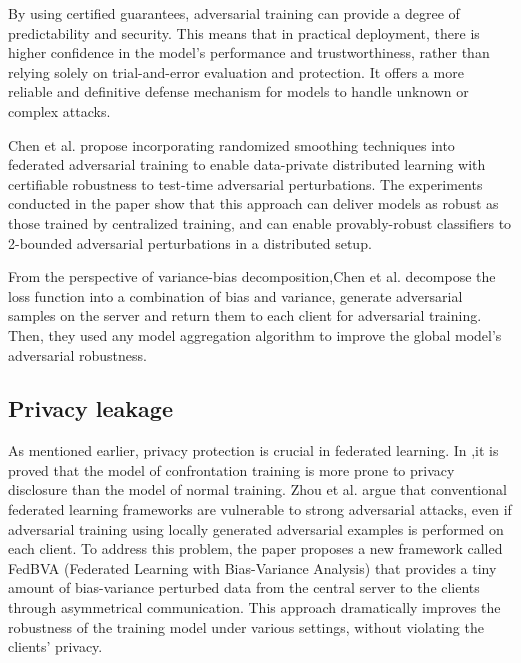 \documentclass[conference]{IEEEtran}
\begin{document}
By using certified guarantees, adversarial training can provide a degree of predictability and security. 
This means that in practical deployment, there is higher confidence in the model's performance and trustworthiness, 
rather than relying solely on trial-and-error evaluation and protection. 
It offers a more reliable and definitive defense mechanism for models to handle unknown or complex attacks.  

Chen et al.\cite{b104} propose incorporating randomized smoothing techniques into federated adversarial
training to enable data-private distributed learning with certifiable robustness to test-time adversarial
perturbations. The experiments conducted in the paper show that this approach can deliver models as
robust as those trained by centralized training, and can enable provably-robust classifiers to
2-bounded adversarial perturbations in a distributed setup.

From the perspective of variance-bias decomposition,Chen et al.\cite{b108} decompose the 
loss function into a combination of bias and variance, generate adversarial samples on the server 
and return them to each client for adversarial training. Then, they used any model aggregation 
algorithm to improve the global model's adversarial robustness.

\subsection{Privacy leakage} 
As mentioned earlier, privacy protection is crucial in federated learning.
In \cite{b106},it is proved that the model of confrontation training is more prone to
privacy disclosure than the model of normal training.
Zhou et al.\cite{b103} argue that conventional federated learning frameworks are vulnerable
to strong adversarial attacks, even if adversarial training using locally
generated adversarial examples is performed on each client. To address this
problem, the paper proposes a new framework called FedBVA (Federated Learning
with Bias-Variance Analysis) that provides a tiny amount of bias-variance
perturbed data from the central server to the clients through asymmetrical
communication. This approach dramatically improves the robustness of the
training model under various settings, without violating the clients' privacy.
\end{document}
